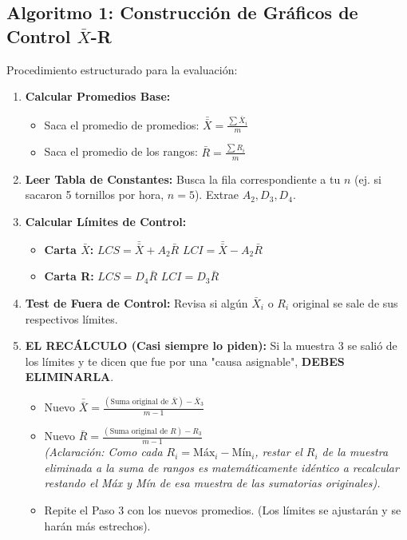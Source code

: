 \subsection{Algoritmo 1: Construcción de Gráficos de Control $\bar{X}$-R}
Procedimiento estructurado para la evaluación:

\begin{enumerate}
    \item \textbf{Calcular Promedios Base:}
    \begin{itemize}
        \item Saca el promedio de promedios: $\bar{\bar{X}} = \frac{\sum \bar{X}_i}{m}$
        \item Saca el promedio de los rangos: $\bar{R} = \frac{\sum R_i}{m}$
    \end{itemize}
    \item \textbf{Leer Tabla de Constantes:} Busca la fila correspondiente a tu \textbf{$n$} (ej. si sacaron 5 tornillos por hora, $n=5$). Extrae $A_2, D_3, D_4$.
    \item \textbf{Calcular Límites de Control:}
    \begin{itemize}
        \item \textbf{Carta $\bar{X}$:} $LCS = \bar{\bar{X}} + A_2 \bar{R}$ \hspace{1cm} $LCI = \bar{\bar{X}} - A_2 \bar{R}$
        \item \textbf{Carta R:} $LCS = D_4 \bar{R}$ \hspace{1.3cm} $LCI = D_3 \bar{R}$
    \end{itemize}
    \item \textbf{Test de Fuera de Control:} Revisa si algún $\bar{X}_i$ o $R_i$ original se sale de sus respectivos límites.
    \item \textbf{EL RECÁLCULO (Casi siempre lo piden):} Si la muestra 3 se salió de los límites y te dicen que fue por una "causa asignable", \textbf{DEBES ELIMINARLA}.
    \begin{itemize}
        \item Nuevo $\bar{\bar{X}} = \frac{(\text{Suma original de } \bar{X}) - \bar{X}_3}{m - 1}$
        \item Nuevo $\bar{R} = \frac{(\text{Suma original de } R) - R_3}{m - 1}$ \\
        \textit{(Aclaración: Como cada $R_i = \text{Máx}_i - \text{Mín}_i$, restar el $R_i$ de la muestra eliminada a la suma de rangos es matemáticamente idéntico a recalcular restando el Máx y Mín de esa muestra de las sumatorias originales).}
        \item Repite el Paso 3 con los nuevos promedios. (Los límites se ajustarán y se harán más estrechos).
    \end{itemize}
\end{enumerate}


